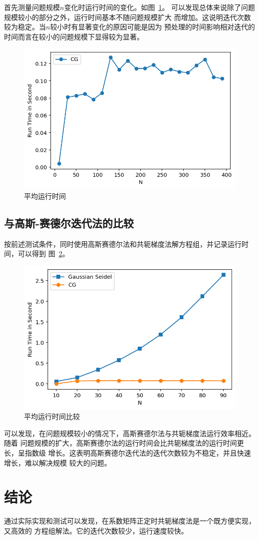 \documentclass[a4paper,twoside]{article}
\begin{document}
\begin{spacing}{1.2}
首先测量问题规模$n$变化时运行时间的变化。如图~\ref{fig:rt}。
可以发现总体来说除了问题规模较小的部分之外，运行时间基本不随问题规模扩大
而增加。这说明迭代次数较为稳定。当$n$较小时有显著变化的原因可能是因为
预处理的时间影响相对迭代的时间而言在较小的问题规模下显得较为显著。

\begin{figure}[htbp]
	\centering
	\label{fig:rt}
	\includegraphics[width=0.5\linewidth]{runtime.png}
	\caption{平均运行时间}
\end{figure}

\subsection{与高斯-赛德尔迭代法的比较}

按前述测试条件，同时使用高斯赛德尔法和共轭梯度法解方程组，并记录运行时间，可以得到
图~\ref{fig:rt_cmp}。
\begin{figure}[htbp]
	\centering
	\label{fig:rt_cmp}
	\includegraphics[width=0.5\linewidth]{runtime_cmp.png}
	\caption{平均运行时间比较}
\end{figure}
可以发现，在问题规模较小的情况下，高斯赛德尔法与共轭梯度法运行效率相近。随着
问题规模的扩大，高斯赛德尔法的运行时间会比共轭梯度法的运行时间更长，呈指数级
增长。这表明高斯赛德尔迭代法的迭代次数较为不稳定，并且快速增长，难以解决规模
较大的问题。

\section{结论}

通过实际实现和测试可以发现，在系数矩阵正定时共轭梯度法是一个既方便实现，又高效的
方程组解法。它的迭代次数较少，运行速度较快。


\end{spacing}
\end{document}
